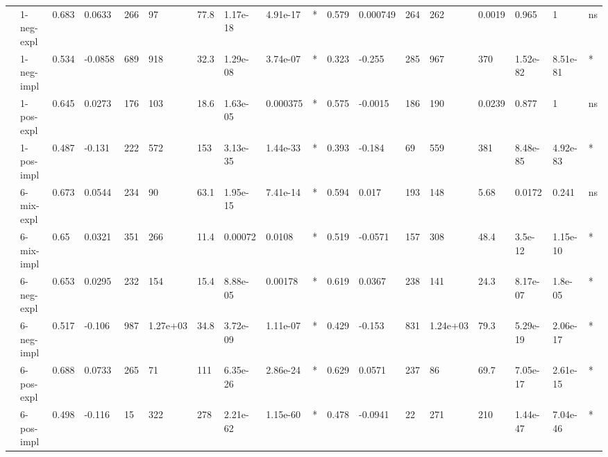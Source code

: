 \begin{table}[hp]
{\begin{adjustbox}{max width=\textwidth}
\begin{tabular}{ll|llllllll|llllllll}
 & 1-neg-expl & 0.683 & 0.0633 & 266 & 97 & 77.8 & 1.17e-18 & 4.91e-17 & * & 0.579 & 0.000749 & 264 & 262 & 0.0019 & 0.965 & 1 & ns \\
 & 1-neg-impl & 0.534 & -0.0858 & 689 & 918 & 32.3 & 1.29e-08 & 3.74e-07 & * & 0.323 & -0.255 & 285 & 967 & 370 & 1.52e-82 & 8.51e-81 & * \\
 & 1-pos-expl & 0.645 & 0.0273 & 176 & 103 & 18.6 & 1.63e-05 & 0.000375 & * & 0.575 & -0.0015 & 186 & 190 & 0.0239 & 0.877 & 1 & ns \\
 & 1-pos-impl & 0.487 & -0.131 & 222 & 572 & 153 & 3.13e-35 & 1.44e-33 & * & 0.393 & -0.184 & 69 & 559 & 381 & 8.48e-85 & 4.92e-83 & * \\
 & 6-mix-expl & 0.673 & 0.0544 & 234 & 90 & 63.1 & 1.95e-15 & 7.41e-14 & * & 0.594 & 0.017 & 193 & 148 & 5.68 & 0.0172 & 0.241 & ns \\
 & 6-mix-impl & 0.65 & 0.0321 & 351 & 266 & 11.4 & 0.00072 & 0.0108 & * & 0.519 & -0.0571 & 157 & 308 & 48.4 & 3.5e-12 & 1.15e-10 & * \\
 & 6-neg-expl & 0.653 & 0.0295 & 232 & 154 & 15.4 & 8.88e-05 & 0.00178 & * & 0.619 & 0.0367 & 238 & 141 & 24.3 & 8.17e-07 & 1.8e-05 & * \\
 & 6-neg-impl & 0.517 & -0.106 & 987 & 1.27e+03 & 34.8 & 3.72e-09 & 1.11e-07 & * & 0.429 & -0.153 & 831 & 1.24e+03 & 79.3 & 5.29e-19 & 2.06e-17 & * \\
 & 6-pos-expl & 0.688 & 0.0733 & 265 & 71 & 111 & 6.35e-26 & 2.86e-24 & * & 0.629 & 0.0571 & 237 & 86 & 69.7 & 7.05e-17 & 2.61e-15 & * \\
 & 6-pos-impl & 0.498 & -0.116 & 15 & 322 & 278 & 2.21e-62 & 1.15e-60 & * & 0.478 & -0.0941 & 22 & 271 & 210 & 1.44e-47 & 7.04e-46 & * \\
\bottomrule
\end{tabular}
\end{adjustbox}
}

\end{table}
